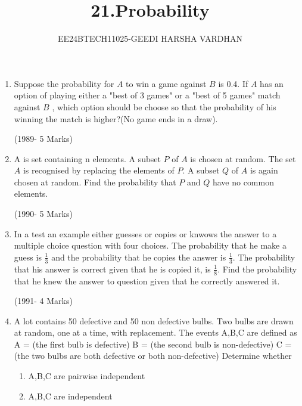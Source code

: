 \documentclass[journal,12pt,onecolumn]{IEEEtran}
\theoremstyle{remark}
\begin{document}

\vspace{3cm}

\title{21.Probability}
\author{EE24BTECH11025-GEEDI HARSHA VARDHAN}
\maketitle
\bigskip

\renewcommand{\thefigure}{\theenumi}
\renewcommand{\thetable}{\theenumi}




\begin{enumerate}
\item Suppose the probability for $A$ to win a game against $B$ is 0.4. If $A$ has an option of playing either a "best of 3 games" or a "best of 5 games" match against $B$ , which option should be choose so that the probability of his winning the match is higher?(No game ends in a draw).

\hfill(1989- 5 Marks)

\item A is set containing n elements. A subset $P$ of $A$ is chosen at random. The set $A$ is recognised by replacing the elements of $P$. A subset $Q$ of $A$ is again chosen at random. Find the probability that $P$ and $Q$ have no common elements.


\hfill(1990- 5 Marks)

\item In a test an example either guesses or copies or knwows the answer to a multiple choice question with four choices. The probability that he make a guess is $\frac{1}{3}$ and the probability that he copies the answer is $\frac{1}{3}$. The probability that his answer is correct given that he is copied it, is $\frac{1}{8}$. Find the probability that he knew the answer to question given that he correctly answered it.

\hfill(1991- 4 Marks)



\item A lot contains 50 defective and 50 non defective bulbs. Two bulbs are drawn at random, one at a time, with replacement. The events A,B,C are defined as 
A = (the first bulb is defective)
B = (the second bulb is non-defective)
C = (the two bulbs are both defective or both non-defective)
Determine whether
\begin{enumerate}
\item A,B,C are pairwise independent
\item A,B,C are independent
\end{enumerate}


\end{enumerate}
\end{document}
